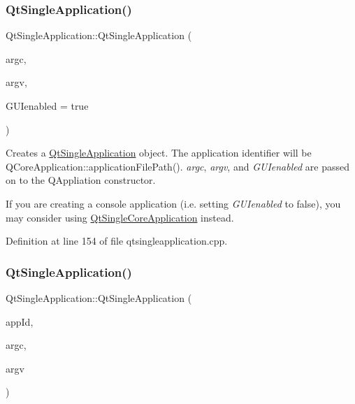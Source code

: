 \subsubsection{\texorpdfstring{Qt\+Single\+Application()}{QtSingleApplication()}\hspace{0.1cm}{\footnotesize\ttfamily [1/3]}}
{\footnotesize\ttfamily Qt\+Single\+Application\+::\+Qt\+Single\+Application (\begin{DoxyParamCaption}\item[{int \&}]{argc,  }\item[{char $\ast$$\ast$}]{argv,  }\item[{bool}]{G\+U\+Ienabled = {\ttfamily true} }\end{DoxyParamCaption})}

Creates a \hyperlink{class_qt_single_application}{Qt\+Single\+Application} object. The application identifier will be Q\+Core\+Application\+::application\+File\+Path(). {\itshape argc}, {\itshape argv}, and {\itshape G\+U\+Ienabled} are passed on to the Q\+Appliation constructor.

If you are creating a console application (i.\+e. setting {\itshape G\+U\+Ienabled} to false), you may consider using \hyperlink{class_qt_single_core_application}{Qt\+Single\+Core\+Application} instead. 

Definition at line 154 of file qtsingleapplication.\+cpp.

\mbox{\label{class_qt_single_application_a746192779985e28f22fd17766884518e}} 
\subsubsection{\texorpdfstring{Qt\+Single\+Application()}{QtSingleApplication()}\hspace{0.1cm}{\footnotesize\ttfamily [2/3]}}
{\footnotesize\ttfamily Qt\+Single\+Application\+::\+Qt\+Single\+Application (\begin{DoxyParamCaption}\item[{const Q\+String \&}]{app\+Id,  }\item[{int \&}]{argc,  }\item[{char $\ast$$\ast$}]{argv }\end{DoxyParamCaption})}

